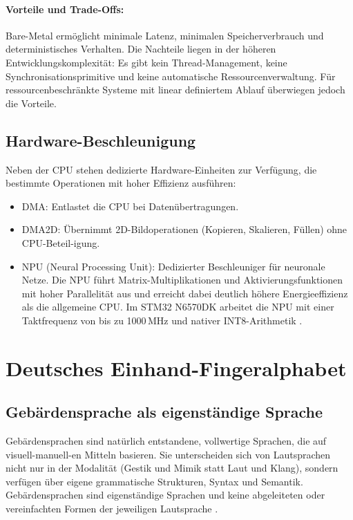 \paragraph{Vorteile und Trade-Offs:}
Bare-Metal ermöglicht minimale Latenz, minimalen Speicherverbrauch und deterministisches Verhalten. Die Nachteile liegen in der höheren Entwicklungskomplexität: Es gibt kein Thread-Management, keine Synchronisationsprimitive und keine automatische Ressourcenverwaltung. Für ressourcenbeschränkte Systeme mit linear definiertem Ablauf überwiegen jedoch die Vorteile.

\subsection{Hardware-Beschleunigung}\label{sub:hardware-beschleunigung}

Neben der CPU stehen dedizierte Hardware-Einheiten zur Verfügung, die bestimmte Operationen mit hoher Effizienz ausführen:

\begin{itemize}
    \item DMA: Entlastet die CPU bei Datenübertragungen.
    \item DMA2D: Übernimmt 2D-Bildoperationen (Kopieren, Skalieren, Füllen) ohne CPU-Beteil-igung.
    \item NPU (Neural Processing Unit): Dedizierter Beschleuniger für neuronale Netze. Die NPU führt Matrix-Multiplikationen und Aktivierungsfunktionen mit hoher Parallelität aus und erreicht dabei deutlich höhere Energieeffizienz als die allgemeine CPU. Im STM32 N6570\-DK arbeitet die NPU mit einer Taktfrequenz von bis zu 1000\,MHz und nativer INT8-Arithmetik \cite[S. 1011 ff.]{rm0486}.
\end{itemize}

\section{Deutsches Einhand-Fingeralphabet}\label{sec:fingeralphabet}

\subsection{Gebärdensprache als eigenständige Sprache}\label{sub:gebaerdensprache}
Gebärdensprachen sind natürlich entstandene, vollwertige Sprachen, die auf visuell-manuell-en Mitteln basieren. Sie unterscheiden sich von Lautsprachen nicht nur in der Modalität (Gestik und Mimik statt Laut und Klang), sondern verfügen über eigene grammatische Strukturen, Syntax und Semantik. Gebärdensprachen sind eigenständige Sprachen und keine abgeleiteten oder vereinfachten Formen der jeweiligen Lautsprache \cite{DeutscheGebaerdensprache}.

